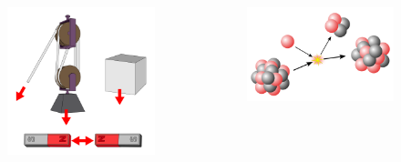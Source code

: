 \documentclass{beamer}
\begin{document}
\begin{frame}
\begin{columns}[b]
\begin{column}{.3\textwidth}
\begin{figure}
                \includegraphics[width=\linewidth]{assets/images/force}
                \caption{\tiny \cite{force}}
            \end{figure}
        \end{column}
        \begin{column}{.3\textwidth}
            \begin{figure}
                \includegraphics[width=\linewidth]{assets/images/isotope}
                \caption{\tiny \cite{isotope}}
            \end{figure}
        \end{column}

\end{columns}
\end{frame}
\end{document}
